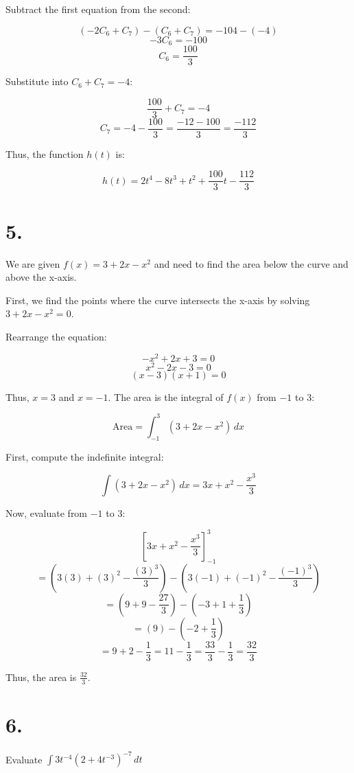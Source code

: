 \documentclass{article}
\begin{document}
Subtract the first equation from the second:

\[
(-2C_6 + C_7) - (C_6 + C_7) = -104 - (-4)
\]
\[
-3C_6 = -100
\]
\[
C_6 = \frac{100}{3}
\]

Substitute into \( C_6 + C_7 = -4 \):

\[
\frac{100}{3} + C_7 = -4
\]
\[
C_7 = -4 - \frac{100}{3} = \frac{-12 - 100}{3} = \frac{-112}{3}
\]

Thus, the function \( h(t) \) is:

\[
h(t) = 2t^4 - 8t^3 + t^2 + \frac{100}{3}t - \frac{112}{3}
\]

\section*{5.}

We are given \( f(x) = 3 + 2x - x^2 \) and need to find the area below the curve and above the x-axis.

First, we find the points where the curve intersects the x-axis by solving \( 3 + 2x - x^2 = 0 \).

Rearrange the equation:

\[
-x^2 + 2x + 3 = 0
\]
\[
x^2 - 2x - 3 = 0
\]
\[
(x - 3)(x + 1) = 0
\]

Thus, \( x = 3 \) and \( x = -1 \). The area is the integral of \( f(x) \) from \( -1 \) to \( 3 \):

\[
\text{Area} = \int_{-1}^{3} (3 + 2x - x^2) \, dx
\]

First, compute the indefinite integral:

\[
\int (3 + 2x - x^2) \, dx = 3x + x^2 - \frac{x^3}{3}
\]

Now, evaluate from \( -1 \) to \( 3 \):

\[
\left[ 3x + x^2 - \frac{x^3}{3} \right]_{-1}^{3}
\]
\[
= \left( 3(3) + (3)^2 - \frac{(3)^3}{3} \right) - \left( 3(-1) + (-1)^2 - \frac{(-1)^3}{3} \right)
\]
\[
= \left( 9 + 9 - \frac{27}{3} \right) - \left( -3 + 1 + \frac{1}{3} \right)
\]
\[
= \left( 9 \right) - \left( -2 + \frac{1}{3} \right)
\]
\[
= 9 + 2 - \frac{1}{3} = 11 - \frac{1}{3} = \frac{33}{3} - \frac{1}{3} = \frac{32}{3}
\]

Thus, the area is \( \frac{32}{3} \).



\section*{6.}

 Evaluate \( \int 3t^{-4} (2 + 4t^{-3})^{-7} \, dt \)
\end{document}
